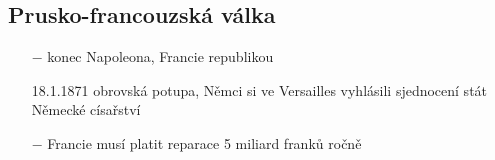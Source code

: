 \documentclass{article}
\begin{document}
\subsection*{Prusko-francouzská válka}
\begin{itemize}
    \vspace{-0.5em}
    \setlength\itemsep{0.15em}
    \item[$-$] konec Napoleona, Francie republikou
    \item[18.1.1871] obrovská potupa, Němci si ve Versailles vyhlásili sjednocení stát Německé císařství
    \item[$-$] Francie musí platit reparace 5 miliard franků ročně
\end{itemize}
\end{document}
